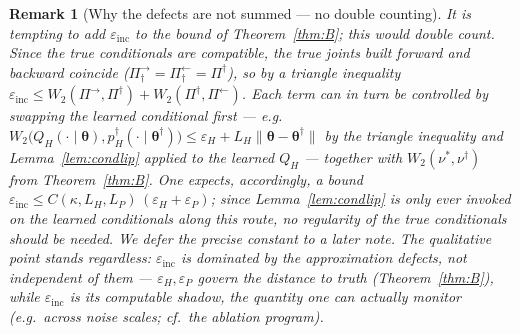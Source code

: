 \documentclass[11pt]{article}
\theoremstyle{definitionbreak}
\theoremstyle{plainbreak}
\theoremstyle{remarkbreak}
\newtheorem{remark}{Remark}[section]
\newcommand{\bth}{\bm{\theta}}
\newcommand{\norm}[1]{\lVert #1 \rVert}
\begin{document}
\begin{remark}[Why the defects are not summed --- no double counting]
\label{rem:nodouble}
It is tempting to add $\varepsilon_{\mathrm{inc}}$ to the bound of Theorem~\ref{thm:B}; this would
double count. Since the true conditionals are compatible, the true joints built forward and backward
coincide ($\Pi^\rightarrow_\dagger=\Pi^\leftarrow_\dagger=\Pi^\dagger$), so by a triangle inequality
$\varepsilon_{\mathrm{inc}}\le W_2(\Pi^\rightarrow,\Pi^\dagger)+W_2(\Pi^\dagger,\Pi^\leftarrow)$. Each
term can in turn be controlled by swapping the \emph{learned} conditional first --- e.g.\
$W_2\big(Q_H(\cdot\mid\bth),p^\dagger_H(\cdot\mid\bth^\dagger)\big)\le\varepsilon_H+L_H\norm{\bth-\bth^\dagger}$
by the triangle inequality and Lemma~\ref{lem:condlip} applied to the learned $Q_H$ --- together with
$W_2(\nu^\ast,\nu^\dagger)$ from Theorem~\ref{thm:B}. One expects, accordingly, a bound
$\varepsilon_{\mathrm{inc}}\le C(\kappa,L_H,L_P)\,(\varepsilon_H+\varepsilon_P)$; since
Lemma~\ref{lem:condlip} is only ever invoked on the learned conditionals along this route, no
regularity of the \emph{true} conditionals should be needed. We defer the precise constant to a later
note. The qualitative point stands regardless: $\varepsilon_{\mathrm{inc}}$ is \emph{dominated by} the
approximation defects, not independent of them --- $\varepsilon_H,\varepsilon_P$ govern the distance
to truth (Theorem~\ref{thm:B}), while $\varepsilon_{\mathrm{inc}}$ is its computable \emph{shadow},
the quantity one can actually monitor (e.g.\ across noise scales; cf.\ the ablation program).
\end{remark}
\end{document}
